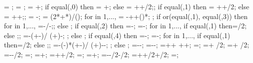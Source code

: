 {{%
\Xaxesstarty = ;
\Yaxesstartx = ;
\Yaxesstarty = \y{\levelnumber}+\axisseperation;
if equal(\showsupports,0) then
{\Xaxesstartx = \x{\columnnumber}+\axisseperation;} else
{\Xaxesstartx = \x{\columnnumber}+\axisseperation+\supportwidth/2;};
if equal(\showsupports,1) then
{\Xaxesstartx = \x{\columnnumber}+\axisseperation+\supportwidth/2;} else
{\Xaxesstartx = \x{\columnnumber}+\axisseperation+\supportwidth;};
\pilecoordy = -\supportheight;
\pilespace = 
(2*\supportwidth+*\pilesidespace)/();
for \pileind in {1,...,{\numberofpiles}}{
\pilecoordx{\pileind} = -\supportwidth+\pilesidespace+()*\pilespace;
};
if or(equal(\latloadtype,1), equal(\latloadtype,3)) then {
for \iarr in {1,...,{\levelnumber}}{
	\arrstartx{\iarr}=-\toparrlen*\y{\iarr}/\structheight-\latloadshift;};
} else {};
if equal(\latloadtype,2) then {
	=-\latloadshift;
	=-\isomidy;
	for \iarr in {1,...,{\levelnumber}}{
		if equal(\iarr,1) then{\addtempy=\supportheight/2;} else {;};
		\arrstartx{\iarr}=-\toparrlen*(\y{\iarr}+\isomidy-\addtempy)/
		(\structheight+\isomidy)-\latloadshift;
	};
} else {};
if equal(\latloadtype,4) then {
	=-\latloadshift;
	=-\isomidy;
	for \iarr in {1,...,{\levelnumber}}{
		if equal(\iarr,1) then{\addtempy=\supportheight/2;} else {;};
		\arrstartx{\iarr}=-(\toparrlen-\basearrlen)*(\y{\iarr}+\isomidy-\addtempy)/
		(\structheight+\isomidy)-\latloadshift-\basearrlen;
	};
} else {};
\engbedrockstartx=-\leftsoildist-\engbedrockleftdist;
\engbedrockstarty=-\soilbelowfoundtof-\engbedrockdepth;
\engbedrockdeltax=\leftsoildist+\engbedrockleftdist+
  \buildingwidth+\rightsoildist+\engbedrockrightdist;
\engbedrockdeltay=\engbedrockdepth;
\engbedrockmidx=\engbedrockstartx + \engbedrockdeltax/2;
\engbedrockmidy=\engbedrockstarty + \engbedrockdeltay/2;
\translayerleftstartx=-\leftsoildist-\translayerlinet/2;
\translayerleftstarty=\leftwallh;
\translayerleftdeltay=\leftwallh+\soilbelowfoundtof;
\translayerrightstartx=\rightsoildist+\buildingwidth+\translayerlinet/2;
\translayerrightstarty=\rightwallh;
\translayerrightdeltay=\rightwallh+\soilbelowfoundtof;
\ssinterleftstartx=-\supportwidth-\baselinet/2-\ssinterlinet/2;
\ssinterrightstartx=\buildingwidth+\supportwidth+\baselinet/2+\ssinterlinet/2;
\ssinterleftstarty=\leftwallh;
}}
